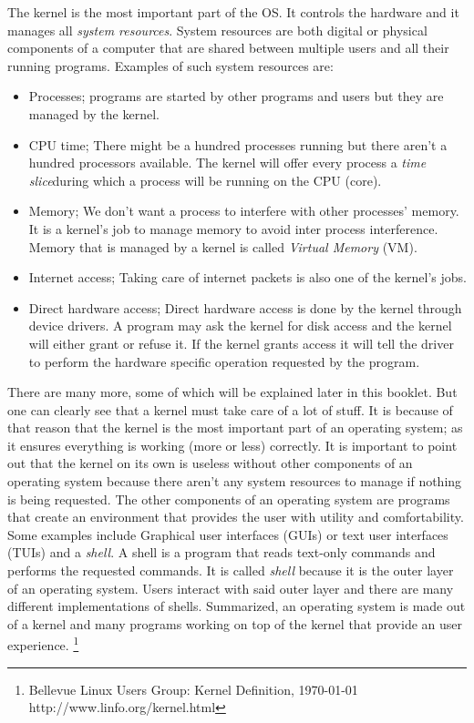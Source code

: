 The kernel is the most important part of the OS. It controls the hardware and it
manages all \textit{system resources}. System resources are both digital or physical
components of a computer that are shared between multiple users and all their
running programs. Examples of such system resources are:
\begin{itemize}
\item Processes; programs are started by other programs and users but they are managed by the kernel.
\item CPU time; There might be a hundred processes running but there aren't a hundred processors available. The kernel will offer every process a \textit{time slice}during which a process will be running on the CPU (core).
\item Memory; We don't want a process to interfere with other processes' memory. It is a kernel's job to manage memory to avoid inter process interference. Memory that is managed by a kernel is called \textit{Virtual Memory} (VM).
\item Internet access; Taking care of internet packets is also one of the kernel's jobs.
\item Direct hardware access; Direct hardware access is done by the kernel through device drivers. A program may ask the kernel for disk access and the kernel will either grant or refuse it. If the kernel grants access it will tell the driver to perform the hardware specific operation requested by the program.
\end{itemize}
There are many more, some of which will be explained later in this booklet.
But one can clearly see that a kernel must take care of a lot of stuff. It
is because of that reason that the kernel is the most important part of an
operating system; as it ensures everything is working (more or less)
correctly. It is important to point out that the kernel on its own is useless
without other components of an operating system because there aren't any
system resources to manage if nothing is being requested.
The other components of an
operating system are programs that create an environment that provides the user with
utility and comfortability. Some examples include Graphical user interfaces (GUIs) 
or text user interfaces (TUIs) and a \textit{shell}. A shell is a
program that reads text-only commands and performs the requested commands. It
is called \textit{shell} because it is the outer layer of an operating system. Users
interact with said outer layer and there are many different implementations
of shells. Summarized, an operating system is made out of a kernel and many programs working on top of the kernel that provide an user experience. \footnote{Bellevue Linux Users Group: Kernel Definition, \today \\ http://www.linfo.org/kernel.html}


